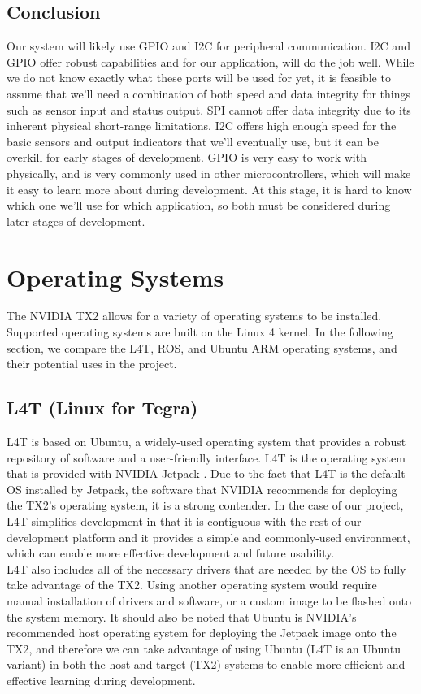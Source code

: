 \subsection{Conclusion}
Our system will likely use GPIO and I2C for peripheral communication. I2C and GPIO offer robust capabilities and for our application, will do the job well. While we do not know exactly what these ports will be used for yet, it is feasible to assume that we'll need a combination of both speed and data integrity for things such as sensor input and status output. SPI cannot offer data integrity due to its inherent physical short-range limitations. I2C offers high enough speed for the basic sensors and output indicators that we'll eventually use, but it can be overkill for early stages of development. GPIO is very easy to work with physically, and is very commonly used in other microcontrollers, which will make it easy to learn more about during development. At this stage, it is hard to know which one we'll use for which application, so both must be considered during later stages of development.

\newpage
\section{Operating Systems}
The NVIDIA TX2 allows for a variety of operating systems to be installed. Supported operating systems are built on the Linux 4 kernel. In the following section, we compare the L4T, ROS, and Ubuntu ARM operating systems, and their potential uses in the project.

\subsection{L4T (Linux for Tegra)}
L4T is based on Ubuntu, a widely-used operating system that provides a robust repository of software and a user-friendly interface. L4T is the operating system that is provided with NVIDIA Jetpack \cite{jetsonSoft}. Due to the fact that L4T is the default OS installed by Jetpack, the software that NVIDIA recommends for deploying the TX2's operating system, it is a strong contender. In the case of our project, L4T simplifies development in that it is contiguous with the rest of our development platform and it provides a simple and commonly-used environment, which can enable more effective development and future usability.\\

L4T also includes all of the necessary drivers that are needed by the OS to fully take advantage of the TX2. Using another operating system would require manual installation of drivers and software, or a custom image to be flashed onto the system memory. It should also be noted that Ubuntu is NVIDIA's recommended host operating system for deploying the Jetpack image onto the TX2, and therefore we can take advantage of using Ubuntu (L4T is an Ubuntu variant) in both the host and target (TX2) systems to enable more efficient and effective learning during development.

